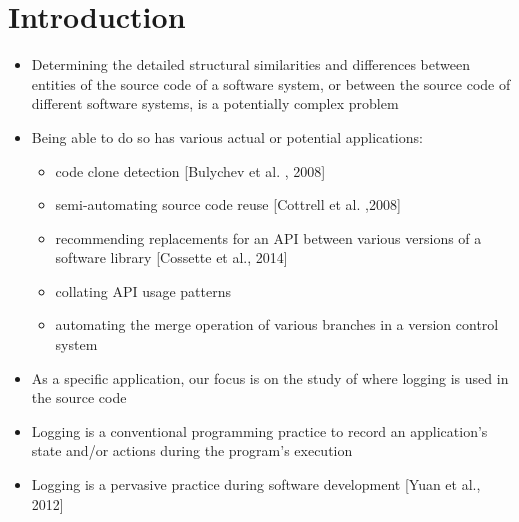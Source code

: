 \chapter{Introduction}  \label{intro}
\begin{itemize} [leftmargin=.01in]
\item Determining the detailed structural similarities and differences between entities of the source code of a software system, or between the source code of different software systems, is a potentially complex problem
\item Being able to do so has various actual or potential applications:
\begin{itemize} [leftmargin=.3in]
\item code clone detection [Bulychev et al. , 2008]
\item semi-automating source code reuse [Cottrell et al. ,2008]
\item recommending replacements for an API between various versions of a software library [Cossette et al., 2014]
\item collating API usage patterns
\item automating the merge operation of various branches in a version control system
\end{itemize}
\item As a specific application, our focus is on the study of where logging is used in the source code
\item Logging is a conventional programming practice to record an application's state and/or actions during the program's execution
\item Logging is a pervasive practice during software development [Yuan et al., 2012]


\end{itemize}
